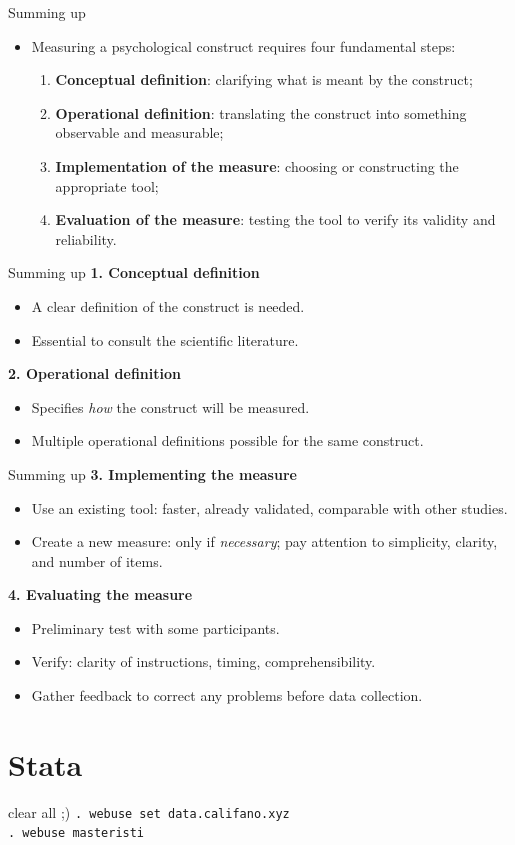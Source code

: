\documentclass{beamer}
\begin{document}
\begin{frame}{Summing up}
    \begin{itemize}
        \item Measuring a psychological construct requires four fundamental steps:
        \begin{enumerate}
            \item \textbf{Conceptual definition}: clarifying what is meant by the construct;
            \item \textbf{Operational definition}: translating the construct into something observable and measurable;
            \item \textbf{Implementation of the measure}: choosing or constructing the appropriate tool;
            \item \textbf{Evaluation of the measure}: testing the tool to verify its validity and reliability.
        \end{enumerate}
    \end{itemize}
\end{frame}

\begin{frame}{Summing up}
    \textbf{1. Conceptual definition}
    \begin{itemize}
        \item A clear definition of the construct is needed.
        \item Essential to consult the scientific literature.
    \end{itemize}
    \vspace{0.5em}
    \textbf{2. Operational definition}
    \begin{itemize}
        \item Specifies \emph{how} the construct will be measured.
        \item Multiple operational definitions possible for the same construct.
    \end{itemize}
\end{frame}

\begin{frame}{Summing up}
    \textbf{3. Implementing the measure}
    \begin{itemize}
        \item Use an existing tool: faster, already validated, comparable with other studies.
        \item Create a new measure: only if \emph{necessary}; pay attention to simplicity, clarity, and number of items.
    \end{itemize}
    \vspace{0.5em}
    \textbf{4. Evaluating the measure}
    \begin{itemize}
        \item Preliminary test with some participants.
        \item Verify: clarity of instructions, timing, comprehensibility.
        \item Gather feedback to correct any problems before data collection.
    \end{itemize}
\end{frame}

\section{Stata}
\begin{frame}{clear all ;)}
    \texttt{. webuse set data.califano.xyz} \\
    \texttt{. webuse masteristi}
\end{frame}
\end{document}
